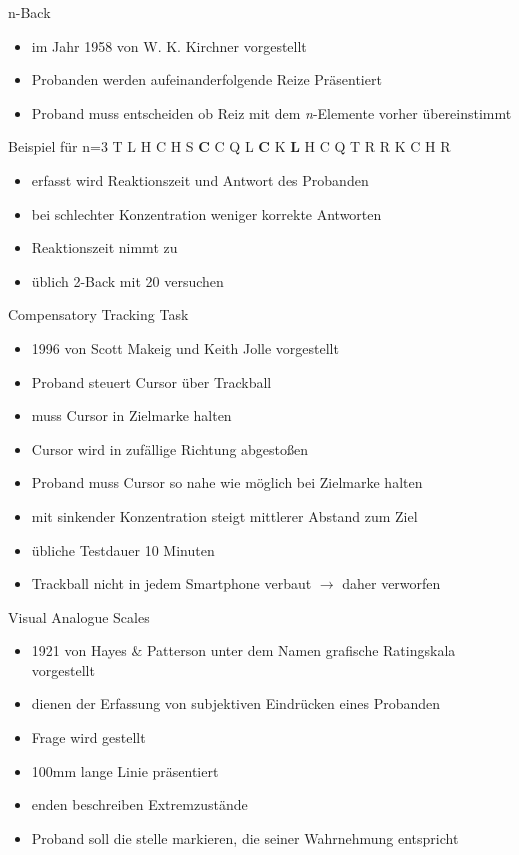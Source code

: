 \begin{frame}{n-Back}
	\begin{itemize}[<+->]
	\item im Jahr 1958 von W. K. Kirchner vorgestellt
	\item Probanden werden aufeinanderfolgende Reize Präsentiert
	\item Proband muss entscheiden ob Reiz mit dem \textit{n}-Elemente vorher übereinstimmt
	\end{itemize}
	\pause
	\begin{block}{Beispiel für n=3}
		T L H C H S \textbf{C} C Q L \textbf{C} K \textbf{L} H C Q T R R K C H R
	\end{block}
	\pause
	\begin{itemize}[<+->]
	\item erfasst wird Reaktionszeit und Antwort des Probanden
	\item bei schlechter Konzentration weniger korrekte Antworten 
	\item Reaktionszeit nimmt zu
	\item üblich 2-Back mit 20 versuchen
	\end{itemize}
\end{frame}
\begin{frame}{Compensatory Tracking Task}
	\begin{itemize}[<+->]
	\item 1996 von Scott Makeig und Keith Jolle vorgestellt
	\item Proband steuert Cursor über Trackball
	\item muss Cursor in Zielmarke halten
	\item Cursor wird in zufällige Richtung abgestoßen
	\item Proband muss Cursor so nahe wie möglich bei Zielmarke halten
	\item mit sinkender Konzentration steigt mittlerer Abstand zum Ziel
	\item übliche Testdauer 10 Minuten
	\item Trackball nicht in jedem Smartphone verbaut $\rightarrow$ daher verworfen
	\end{itemize}
\end{frame}
\begin{frame}{Visual Analogue Scales}
	 \begin{itemize}[<+->]
	 \item 1921 von Hayes \& Patterson unter dem Namen grafische Ratingskala vorgestellt
	 \item dienen der Erfassung von subjektiven Eindrücken eines Probanden
	 \item Frage wird gestellt
	 \item 100mm lange Linie präsentiert
	 \item enden beschreiben Extremzustände
	 \item Proband soll die stelle markieren, die seiner Wahrnehmung entspricht
	 \end{itemize}
\end{frame}